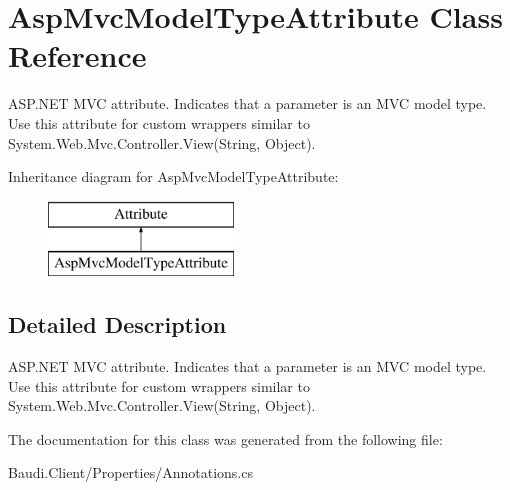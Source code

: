 \hypertarget{class_asp_mvc_model_type_attribute}{}\section{Asp\+Mvc\+Model\+Type\+Attribute Class Reference}
\label{class_asp_mvc_model_type_attribute}


A\+S\+P.\+N\+E\+T M\+V\+C attribute. Indicates that a parameter is an M\+V\+C model type. Use this attribute for custom wrappers similar to {\ttfamily System.\+Web.\+Mvc.\+Controller.\+View(\+String, Object)}.  


Inheritance diagram for Asp\+Mvc\+Model\+Type\+Attribute\+:\begin{figure}[H]
\begin{center}
\leavevmode
\includegraphics[height=2.000000cm]{class_asp_mvc_model_type_attribute}
\end{center}
\end{figure}


\subsection{Detailed Description}
A\+S\+P.\+N\+E\+T M\+V\+C attribute. Indicates that a parameter is an M\+V\+C model type. Use this attribute for custom wrappers similar to {\ttfamily System.\+Web.\+Mvc.\+Controller.\+View(\+String, Object)}. 



The documentation for this class was generated from the following file\+:\begin{DoxyCompactItemize}
\item 
Baudi.\+Client/\+Properties/Annotations.\+cs\end{DoxyCompactItemize}
